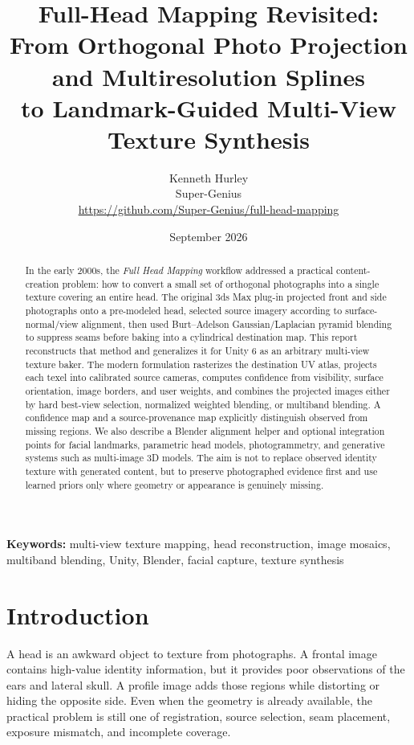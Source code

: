 \documentclass[10pt]{article}
\title{\textbf{Full-Head Mapping Revisited:}\\From Orthogonal Photo Projection and Multiresolution Splines\\to Landmark-Guided Multi-View Texture Synthesis}
\author{Kenneth Hurley\\Super-Genius\\\url{https://github.com/Super-Genius/full-head-mapping}}
\date{September 2026}
\begin{document}
\maketitle

\begin{abstract}
In the early 2000s, the \emph{Full Head Mapping} workflow addressed a practical content-creation problem: how to convert a small set of orthogonal photographs into a single texture covering an entire head. The original 3ds Max plug-in projected front and side photographs onto a pre-modeled head, selected source imagery according to surface-normal/view alignment, then used Burt--Adelson Gaussian/Laplacian pyramid blending to suppress seams before baking into a cylindrical destination map. This report reconstructs that method and generalizes it for Unity 6 as an arbitrary multi-view texture baker. The modern formulation rasterizes the destination UV atlas, projects each texel into calibrated source cameras, computes confidence from visibility, surface orientation, image borders, and user weights, and combines the projected images either by hard best-view selection, normalized weighted blending, or multiband blending. A confidence map and a source-provenance map explicitly distinguish observed from missing regions. We also describe a Blender alignment helper and optional integration points for facial landmarks, parametric head models, photogrammetry, and generative systems such as multi-image 3D models. The aim is not to replace observed identity texture with generated content, but to preserve photographed evidence first and use learned priors only where geometry or appearance is genuinely missing.
\end{abstract}

\textbf{Keywords:} multi-view texture mapping, head reconstruction, image mosaics, multiband blending, Unity, Blender, facial capture, texture synthesis

\section{Introduction}
A head is an awkward object to texture from photographs. A frontal image contains high-value identity information, but it provides poor observations of the ears and lateral skull. A profile image adds those regions while distorting or hiding the opposite side. Even when the geometry is already available, the practical problem is still one of registration, source selection, seam placement, exposure mismatch, and incomplete coverage.
\end{document}
